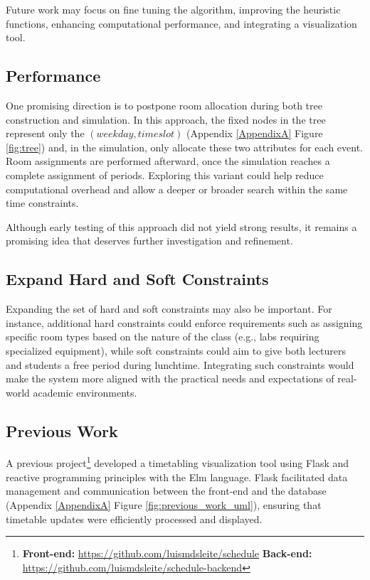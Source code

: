 Future work may focus on fine tuning the algorithm, improving the heuristic functions, enhancing computational performance, and integrating a visualization tool.

\subsection{Performance}

One promising direction is to postpone room allocation during both tree construction and simulation. In this approach, the fixed nodes in the tree represent only the \((weekday, timeslot)\) (Appendix \ref{AppendixA} Figure \ref{fig:tree}) and, in the simulation, only allocate these two attributes for each event. Room assignments are performed afterward, once the simulation reaches a complete assignment of periods. Exploring this variant could help reduce computational overhead and allow a deeper or broader search within the same time constraints.

Although early testing of this approach did not yield strong results, it remains a promising idea that deserves further investigation and refinement.

\subsection{Expand Hard and Soft Constraints}

Expanding the set of hard and soft constraints may also be important. For instance, additional hard constraints could enforce requirements such as assigning specific room types based on the nature of the class (e.g., labs requiring specialized equipment), while soft constraints could aim to give both lecturers and students a free period during lunchtime. Integrating such constraints would make the system more aligned with the practical needs and expectations of real-world academic environments.

\subsection{Previous Work}

A previous project\footnote{\textbf{Front-end:} \url{https://github.com/luismdsleite/schedule} \textbf{Back-end:} \url{https://github.com/luismdsleite/schedule-backend}} developed a timetabling visualization tool using Flask and reactive programming principles with the Elm language. Flask facilitated data management and communication between the front-end and the database (Appendix \ref{AppendixA} Figure \ref{fig:previous_work_uml}), ensuring that timetable updates were efficiently processed and displayed. 

